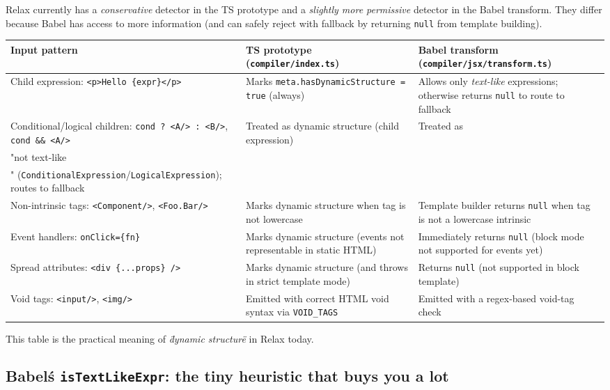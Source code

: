 Relax currently has a \emph{conservative} detector in the TS prototype and a \emph{slightly more permissive} detector in the Babel transform.
They differ because Babel has access to more information (and can safely reject with fallback by returning \texttt{null} from template building).

\begin{center}
\begin{tabular}{|p{}|p{}|p{}|}
\hline
	\textbf{Input pattern} & \textbf{TS prototype (\texttt{compiler/index.ts})} & \textbf{Babel transform (\texttt{compiler/jsx/transform.ts})}\\
\hline
Child expression: \texttt{<p>Hello \{expr\}</p>} & Marks \texttt{meta.hasDynamicStructure = true} (always) & Allows only \emph{text-like} expressions; otherwise returns \texttt{null} to route to fallback \\
\hline
Conditional/logical children: \texttt{cond ? <A/> : <B/>}, \texttt{cond \&\& <A/>} & Treated as dynamic structure (child expression) & Treated as \\"not text-like\\" (\texttt{ConditionalExpression}/\texttt{LogicalExpression}); routes to fallback \\
\hline
Non-intrinsic tags: \texttt{<Component/>}, \texttt{<Foo.Bar/>} & Marks dynamic structure when tag is not lowercase & Template builder returns \texttt{null} when tag is not a lowercase intrinsic \\
\hline
Event handlers: \texttt{onClick=\{fn\}} & Marks dynamic structure (events not representable in static HTML) & Immediately returns \texttt{null} (block mode not supported for events yet) \\
\hline
Spread attributes: \texttt{<div \{...props\} />} & Marks dynamic structure (and throws in strict template mode) & Returns \texttt{null} (not supported in block template) \\
\hline
Void tags: \texttt{<input/>}, \texttt{<img/>} & Emitted with correct HTML void syntax via \texttt{VOID\_TAGS} & Emitted with a regex-based void-tag check \\
\hline
\end{tabular}
\end{center}

This table is the practical meaning of \emph{\"dynamic structure\"} in Relax today.

\subsection{Babel\'s \texttt{isTextLikeExpr}: the tiny heuristic that buys you a lot}

